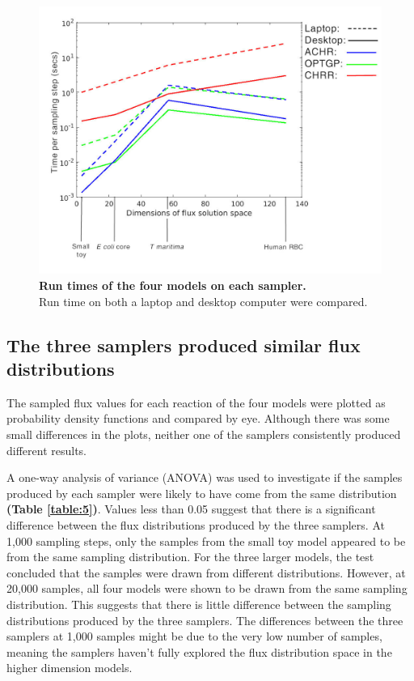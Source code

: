 \documentclass[10pt,letterpaper]{article}
\begin{document}
\begin{figure}[!h]
\centering
\includegraphics[scale=0.6]{fig5.png}
\caption{\textbf{Run times of the four models on each sampler.}\\
Run time on both a laptop and desktop computer were compared.
}
\label{figure:5}
\end{figure}

\subsection*{The three samplers produced similar flux distributions}
The sampled flux values for each reaction of the four models were plotted as probability density functions and compared by eye. Although there was some small differences in the plots, neither one of the samplers consistently produced different results. 

A one-way analysis of variance (ANOVA) was used to investigate if the samples produced by each sampler were likely to have come from the same distribution \textbf{(Table \ref{table:5})}. Values less than 0.05 suggest that there is a significant difference between the flux distributions produced by the three samplers. At 1,000 sampling steps, only the samples from the small toy model appeared to be from the same sampling distribution. For the three larger models, the test concluded that the samples were drawn from different distributions. However, at 20,000 samples, all four models were shown to be drawn from the same sampling distribution. This suggests that there is little difference between the sampling distributions produced by the three samplers. The differences between the three samplers at 1,000 samples might be due to the very low number of samples, meaning the samplers haven’t fully explored the flux distribution space in the higher dimension models. 
\end{document}
